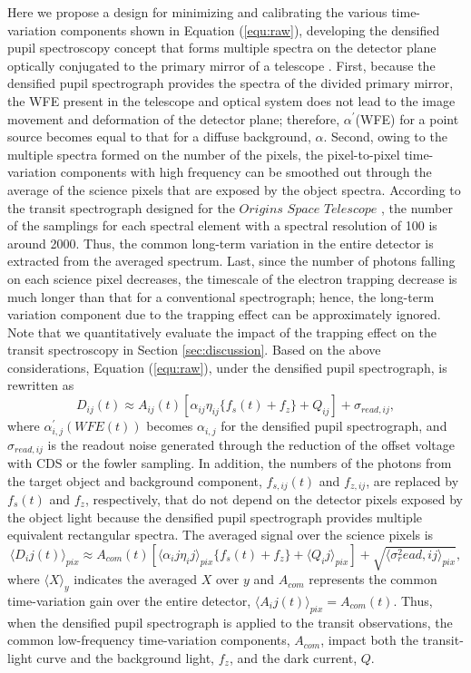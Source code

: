 \documentclass{aastex62}
\def\hoge<#1>{\langle #1 \rangle}
\begin{document}
Here we propose a design for minimizing and calibrating the various time-variation components shown in Equation (\ref{equ:raw}), developing the densified pupil spectroscopy concept that forms multiple spectra on the detector plane optically conjugated to the primary mirror of a telescope \citep[see also Figure \ref{fig:detector_plane}]{2016ApJ...823..139M}. First, because the densified pupil spectrograph provides the spectra of the divided primary mirror, the WFE present in the telescope and optical system does not lead to the image movement and deformation of the detector plane; therefore, $\alpha^{'}$(WFE) for a point source becomes equal to that for a diffuse background, $\alpha$. Second, owing to the multiple spectra formed on the number of the pixels, the pixel-to-pixel time-variation components with high frequency can be smoothed out through the average of the science pixels that are exposed by the object spectra. According to the transit spectrograph designed for the $Origins$ $Space$ $Telescope$ \citep{2016SPIE.10698}, the number of the samplings for each spectral element with a spectral resolution of 100 is around 2000. Thus, the common long-term variation in the entire detector is extracted from the averaged spectrum. Last, since the number of photons falling on each science pixel decreases, the timescale of the electron trapping decrease is much longer  than that for a conventional spectrograph; hence, the long-term variation component due to the trapping effect can be approximately ignored. Note that we quantitatively evaluate the impact of the trapping effect on the transit spectroscopy in Section \ref{sec:discussion}. Based on the above considerations, Equation (\ref{equ:raw}), under the densified pupil spectrograph, is rewritten as
\begin{equation}
D_{ij}(t) \approx A_{ij}(t)[\alpha_{ij}\eta_{ij}\{f_{s}(t)+f_{z}\}+Q_{ij}]+\sigma_{read,ij} ,
\end{equation}
where $\alpha^{'}_{i,j}(WFE(t))$ becomes $\alpha_{i,j}$ for the densified pupil spectrograph, and $\sigma_{read,ij}$ is the readout noise generated through the reduction of the offset voltage with CDS or the fowler sampling. In addition, the numbers of the photons from the target object and background component, $f_{s,ij}(t)$ and $f_{z,ij}$, are replaced by $f_{s}(t)$ and $f_z$, respectively, that do not depend on the detector pixels exposed by the object light because the densified pupil spectrograph provides multiple equivalent rectangular spectra. The averaged signal over the science pixels is
\begin{equation}
\hoge<D_{ij}(t)>_{pix} \approx A_{com}(t)[\hoge<\alpha_{ij}\eta_{ij}>_{pix}\{f_{s}(t)+f_{z}\}+\hoge<Q_{ij}>_{pix}]+\sqrt{\hoge<\sigma^{2}_{read,ij}>_{pix}} ,
\end{equation}
where $\hoge<X>_y$ indicates the averaged $X$ over $y$ and $A_{com}$ represents the common time-variation gain over the entire detector, $\hoge<A_{ij}(t)>_{pix}=A_{com}(t)$. Thus, when the densified pupil spectrograph is applied to the transit observations, the common low-frequency time-variation components, $A_{com}$, impact both the transit-light curve and the background light, $f_z$, and the dark current, $Q$.
\end{document}
